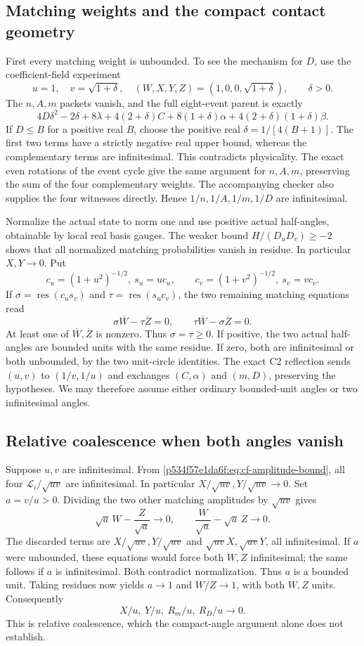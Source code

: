 \subsection{Matching weights and the compact contact geometry}
First every matching weight is unbounded. To see the mechanism for
\(D\), use the coefficient-field experiment
\[
 u=1,\quad v=\sqrt{1+\delta},\quad
 (W,X,Y,Z)=(1,0,0,\sqrt{1+\delta}),\qquad\delta>0.
\]
The \(n,A,m\) packets vanish, and the full eight-event parent is exactly
\[
4D\delta^2-2\delta+8\lambda+4(2+\delta)C
 +8(1+\delta)\alpha+4(2+\delta)(1+\delta)\beta.
\]
If \(D\le B\) for a positive real \(B\), choose the positive real
\(\delta=1/[4(B+1)]\). The first two terms have a strictly negative
real upper bound, whereas the complementary terms are infinitesimal.
This contradicts physicality. The exact even rotations of the event
cycle give the same argument for \(n,A,m\), preserving the sum of the
four complementary weights. The accompanying checker also supplies
the four witnesses directly. Hence \(1/n,1/A,1/m,1/D\) are infinitesimal.

Normalize the actual state to norm one and use positive actual
half-angles, obtainable by local real basis gauges. The weaker
bound \(H/(D_uD_v)\ge-2\) shows that all normalized matching
probabilities vanish in residue. In particular \(X,Y\to0\).
Put
\[
c_u=(1+u^2)^{-1/2},\ s_u=uc_u,\qquad
c_v=(1+v^2)^{-1/2},\ s_v=vc_v.
\]
If \(\sigma=\operatorname{res}(c_us_v)\) and
\(\tau=\operatorname{res}(s_uc_v)\), the two remaining matching
equations read
\[
\sigma\overline W-\tau\overline Z=0,\qquad
\tau\overline W-\sigma\overline Z=0.
\]
At least one of \(\overline W,\overline Z\) is nonzero. Thus
\(\sigma=\tau\ge0\). If positive, the two actual half-angles are
bounded units with the same residue. If zero, both are infinitesimal
or both unbounded, by the two unit-circle identities. The exact C2
reflection sends \((u,v)\) to \((1/v,1/u)\) and exchanges
\((C,\alpha)\) and \((m,D)\), preserving the hypotheses. We may
therefore assume either ordinary bounded-unit angles or two
infinitesimal angles.

\subsection{Relative coalescence when both angles vanish}
Suppose \(u,v\) are infinitesimal. From
\eqref{p534f57e1da6f:eq:cf-amplitude-bound}, all four
\(\mathcal L_i/\sqrt{uv}\) are infinitesimal. In particular
\(X/\sqrt{uv},Y/\sqrt{uv}\to0\). Set \(a=v/u>0\).
Dividing the two other matching amplitudes by \(\sqrt{uv}\) gives
\[
\sqrt a\,W-\frac Z{\sqrt a}\longrightarrow0,\qquad
\frac W{\sqrt a}-\sqrt a\,Z\longrightarrow0.
\]
The discarded terms are \(X/\sqrt{uv},Y/\sqrt{uv}\) and
\(\sqrt{uv}X,\sqrt{uv}Y\), all infinitesimal.
If \(a\) were unbounded, these equations would force both \(W,Z\)
infinitesimal; the same follows if \(a\) is infinitesimal.
Both contradict normalization. Thus \(a\) is a bounded unit.
Taking residues now yields \(a\to1\) and \(W/Z\to1\), with
both \(W,Z\) units. Consequently
\[
                  X/u,\ Y/u,\ R_m/u,\ R_D/u\longrightarrow0.
\]
This is relative coalescence, which the compact-angle argument alone
does not establish.

